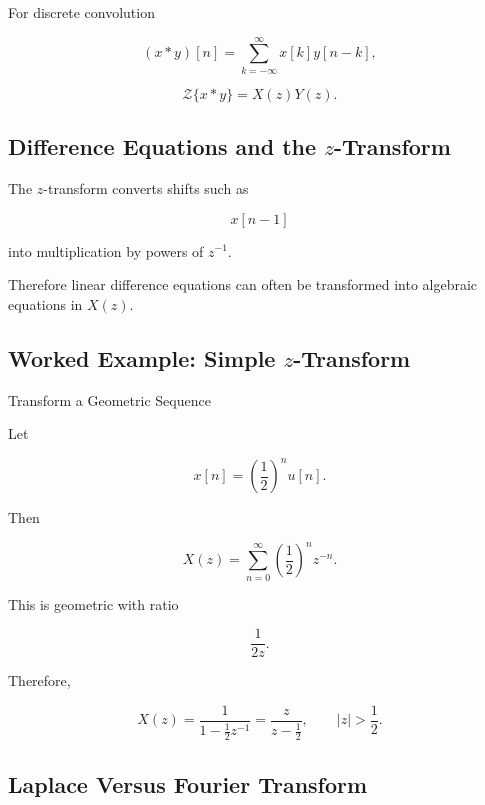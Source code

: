 For discrete convolution

\[
(x*y)[n]
=
\sum_{k=-\infty}^{\infty}
x[k]y[n-k],
\]

\[
\boxed{
\mathcal{Z}\{x*y\}
=
X(z)Y(z).
}
\]

\subsection{Difference Equations and the \(z\)-Transform}
\label{subsec:z-transform-difference-equations}

The \(z\)-transform converts shifts such as

\[
x[n-1]
\]

into multiplication by powers of \(z^{-1}\).

Therefore linear difference equations can often be transformed into algebraic
equations in \(X(z)\).

\subsection{Worked Example: Simple \(z\)-Transform}
\label{subsec:worked-z-transform}

\begin{workedexamplebox}{Transform a Geometric Sequence}

Let

\[
x[n]
=
\left(
\frac12
\right)^n
u[n].
\]

Then

\[
X(z)
=
\sum_{n=0}^{\infty}
\left(
\frac12
\right)^n
z^{-n}.
\]

This is geometric with ratio

\[
\frac{1}{2z}.
\]

Therefore,

\begin{answerbox}
\[
\boxed{
X(z)
=
\frac{
1
}{
1-\frac12z^{-1}
}
=
\frac{
z
}{
z-\frac12
},
\qquad
|z|>\frac12.
}
\]
\end{answerbox}

\end{workedexamplebox}

\subsection{Laplace Versus Fourier Transform}
\label{subsec:laplace-versus-fourier-reference}

